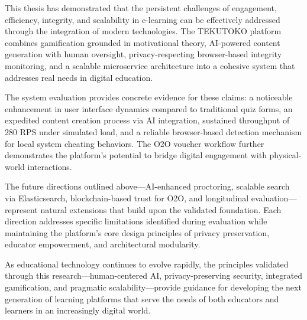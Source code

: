 This thesis has demonstrated that the persistent challenges of engagement, efficiency, integrity, and scalability in e-learning can be effectively addressed through the integration of modern technologies. The TEKUTOKO platform combines gamification grounded in motivational theory, AI-powered content generation with human oversight, privacy-respecting browser-based integrity monitoring, and a scalable microservice architecture into a cohesive system that addresses real needs in digital education.

The system evaluation provides concrete evidence for these claims: a noticeable enhancement in user interface dynamics compared to traditional quiz forms, an expedited content creation process via AI integration, sustained throughput of 280 RPS under simulated load, and a reliable browser-based detection mechanism for local system cheating behaviors. The O2O voucher workflow further demonstrates the platform's potential to bridge digital engagement with physical-world interactions.

The future directions outlined above—AI-enhanced proctoring, scalable search via Elasticsearch, blockchain-based trust for O2O, and longitudinal evaluation—represent natural extensions that build upon the validated foundation. Each direction addresses specific limitations identified during evaluation while maintaining the platform's core design principles of privacy preservation, educator empowerment, and architectural modularity.

As educational technology continues to evolve rapidly, the principles validated through this research—human-centered AI, privacy-preserving security, integrated gamification, and pragmatic scalability—provide guidance for developing the next generation of learning platforms that serve the needs of both educators and learners in an increasingly digital world.
